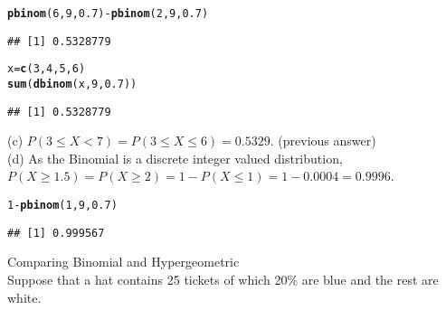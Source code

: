 \documentclass[bigtut]{tutorial}\usepackage[]{graphicx}\usepackage[]{color}
\makeatletter
\newcommand{\hlnum}[1]{\textcolor[rgb]{0.686,0.059,0.569}{#1}}%
\newcommand{\hlopt}[1]{\textcolor[rgb]{0,0,0}{#1}}%
\newcommand{\hlstd}[1]{\textcolor[rgb]{0.345,0.345,0.345}{#1}}%
\newcommand{\hlkwb}[1]{\textcolor[rgb]{0.69,0.353,0.396}{#1}}%
\newcommand{\hlkwd}[1]{\textcolor[rgb]{0.737,0.353,0.396}{\textbf{#1}}}%
\newenvironment{kframe}{%
 \def\at@end@of@kframe{}%
 \ifinner\ifhmode%
  \def\at@end@of@kframe{\end{minipage}}%
  \begin{minipage}{\columnwidth}%
 \fi\fi%
 \def\FrameCommand##1{\hskip\@totalleftmargin \hskip-\fboxsep
 \colorbox{shadecolor}{##1}\hskip-\fboxsep
     \hskip-\linewidth \hskip-\@totalleftmargin \hskip\columnwidth}%
 \MakeFramed {\advance\hsize-\width
   \@totalleftmargin\z@ \linewidth\hsize
   \@setminipage}}%
 {\par\unskip\endMakeFramed%
 \at@end@of@kframe}
\newenvironment{knitrout}{}{} %
\makeatother
\begin{document}
\begin{tutorial}
\begin{questions}
\begin{solution}
\begin{knitrout}
\color{fgcolor}\begin{kframe}
\begin{alltt}
\hlkwd{pbinom}\hlstd{(}\hlnum{6}\hlstd{,}\hlnum{9}\hlstd{,}\hlnum{0.7}\hlstd{)}\hlopt{-}\hlkwd{pbinom}\hlstd{(}\hlnum{2}\hlstd{,}\hlnum{9}\hlstd{,}\hlnum{0.7}\hlstd{)}
\end{alltt}
\begin{verbatim}
## [1] 0.5328779
\end{verbatim}
\begin{alltt}
\hlstd{x}\hlkwb{=}\hlkwd{c}\hlstd{(}\hlnum{3}\hlstd{,}\hlnum{4}\hlstd{,}\hlnum{5}\hlstd{,}\hlnum{6}\hlstd{)}
\hlkwd{sum}\hlstd{(}\hlkwd{dbinom}\hlstd{(x,}\hlnum{9}\hlstd{,}\hlnum{0.7}\hlstd{))}
\end{alltt}
\begin{verbatim}
## [1] 0.5328779
\end{verbatim}
\end{kframe}
\end{knitrout}

\vspace{.5cm}
(c)
$P(3  \leq X < 7) = P(3  \leq X \leq 6) = 0.5329$. (previous answer) \\

\vspace{.5cm}
(d)
As the Binomial is a discrete integer valued distribution, \\
$P(X \geq 1.5) = P(X \geq 2) = 1 - P(X \leq 1) = 1 - 0.0004 = 0.9996$. \\

\begin{knitrout}
\color{fgcolor}\begin{kframe}
\begin{alltt}
\hlnum{1}\hlopt{-}\hlkwd{pbinom}\hlstd{(}\hlnum{1}\hlstd{,}\hlnum{9}\hlstd{,}\hlnum{0.7}\hlstd{)}
\end{alltt}
\begin{verbatim}
## [1] 0.999567
\end{verbatim}
\end{kframe}
\end{knitrout}
\end{solution}


\question Comparing Binomial and Hypergeometric \\

Suppose that a hat contains 25 tickets of which 20\% are blue and the rest are white.  \\


\end{questions}
\end{tutorial}
\end{document}
